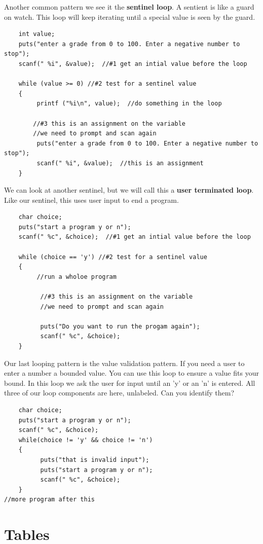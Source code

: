 Another common pattern we see it the {\bf sentinel loop}. A sentient is like a guard on watch. This loop will keep iterating until a special value is seen by the guard.  
\begin{verbatim}
 	int value;
 	puts("enter a grade from 0 to 100. Enter a negative number to stop");
 	scanf(" %i", &value);  //#1 get an intial value before the loop
	
 	while (value >= 0) //#2 test for a sentinel value
 	{
	  	 printf ("%i\n", value);  //do something in the loop
		
	    //#3 this is an assignment on the variable
	    //we need to prompt and scan again
	     puts("enter a grade from 0 to 100. Enter a negative number to stop");
	     scanf(" %i", &value);  //this is an assignment
 	}
\end{verbatim}
%
We can look at another sentinel, but we will call this a {\bf user terminated loop}. Like our sentinel, this uses user input to end a program.
\begin{verbatim}
	char choice;
	puts("start a program y or n");
	scanf(" %c", &choice);  //#1 get an intial value before the loop
	
	while (choice == 'y') //#2 test for a sentinel value
	{
		 //run a wholoe program
		
		  //#3 this is an assignment on the variable
		  //we need to prompt and scan again
		
		  puts("Do you want to run the progam again");
		  scanf(" %c", &choice); 
	}
\end{verbatim}
%
Our last looping pattern is the value validation pattern. If you need a user to enter a number a bounded value. You can use this loop to ensure a value fits your bound.  In this loop we ask the user for input until an 'y' or an 'n' is entered. All three of our loop components are here, unlabeled. Can you identify them?
\begin{verbatim}
	char choice;
	puts("start a program y or n");
	scanf(" %c", &choice);  
	while(choice != 'y' && choice != 'n')
	{
		  puts("that is invalid input");
		  puts("start a program y or n");
		  scanf(" %c", &choice);  
	}	
//more program after this
\end{verbatim}
%

\section{Tables}

